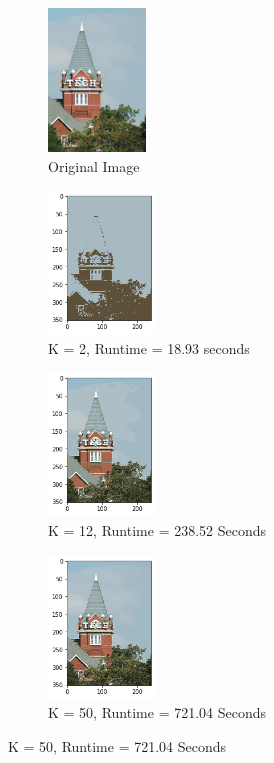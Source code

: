 \documentclass[twoside,10pt]{article}
\begin{document}
\begin{enumerate}
\begin{itemize}
  
  \begin{figure}
    \begin{subfigure}{.5\textwidth}
  \centering
  \includegraphics[height=1.5in]{Images/TechTower.jpg}  
  \caption{Original Image}
  \label{fig:sub-first}
\end{subfigure}
\begin{subfigure}{.5\textwidth}
  \centering
  \includegraphics[height=1.5in]{Images/techtowerkmeans2.png}  
  \caption{K = 2, Runtime = 18.93 seconds}
  \label{fig:sub-first}
\end{subfigure}
\begin{subfigure}{.5\textwidth}
  \centering
  \includegraphics[height=1.5in]{Images/techtowerkmeans12.png}  
  \caption{K = 12, Runtime = 238.52 Seconds}
  \label{fig:sub-second}
\end{subfigure}
\begin{subfigure}{.5\textwidth}
  \centering
  \includegraphics[height=1.5in]{Images/techtowerkmeans50.png}  
  \caption{K = 50, Runtime = 721.04 Seconds}
  \label{fig:sub-third}
\end{subfigure}


\end{figure}
\end{itemize}
\end{enumerate}
\end{document}
